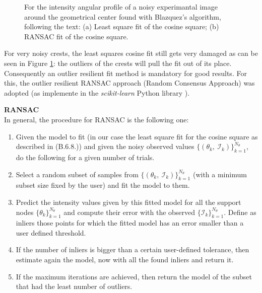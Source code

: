 \documentclass[11pt, a4paper, twoside]{article} %
\DeclareRobustCommand{\mybox}[2][gray!10]{%
\begin{tcolorbox}[   %
        left=0.2cm,
        right=0.2cm,
        top=0.15cm,
        bottom=0.15cm,
        colback=#1,
        colframe=#1,
        width=\dimexpr\textwidth\relax, 
        enlarge left by=0mm,
        boxsep=5pt,
        arc=0pt,outer arc=0pt,
        ]
        #2
\end{tcolorbox}
}
\begin{document}
\begin{figure}[h!] 
     \centering 
    \caption{For the intensity angular profile of a noisy experimantal image around the geometrical center found with Blazquez's algorithm, following the text: (a) Least square fit of the cosine square; (b) RANSAC fit of the cosine square. }
    \label{fig:ransac}
\end{figure}

For very noisy crests, the least squares cosine fit still gets very damaged as can be seen in Figure \ref{fig:ransac}: the outliers of the crests will pull the fit out of its place. Consequently an outlier resilient fit method is mandatory for good results. For this, the outlier resilient RANSAC approach (Random Consensus Approach) \cite{RANSAC} was adopted (as implemente in the {\em scikit-learn} Python library \cite{sklearn}). 

\mybox{{\bf RANSAC\vspace{0.1cm}\\}
In general, the procedure for RANSAC is the following one:
\begin{enumerate}
\item Given the model to fit (in our case the least square fit for the cosine square as described in (B.6.8.)) and given the noisy observed values $\{(\theta_k,\ \mathcal{I}_k)\}_{k=1}^{N_\theta}$, do the following for a given number of trials.

\item Select a random subset of samples from $\{(\theta_k,\ \mathcal{I}_k)\}_{k=1}^{N_\theta}$ (with a minimum subset size fixed by the user) and fit the model to them.
\item Predict the intensity values given by this fitted model for all the support nodes $\{\theta_k\}_{k=1}^{N_\theta}$ and compute their error with the observed $\{\mathcal{I}_k\}_{k=1}^{N_\theta}$. Define as inliers those points for which the fitted model has an error smaller than a user defined threshold.

\item If the number of inliers is bigger than a certain user-defined tolerance, then estimate again the model, now with all the found inliers and return it.

\item If the maximum iterations are achieved, then return the model of the subset that had the least number of outliers.
\end{enumerate}
}
\end{document}
